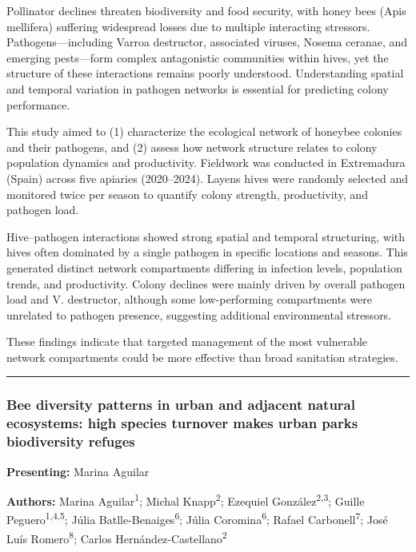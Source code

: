 \documentclass[
  letterpaper,
  DIV=11,
  numbers=noendperiod]{scrartcl}
\begin{document}
Pollinator declines threaten biodiversity and food security, with honey
bees (Apis mellifera) suffering widespread losses due to multiple
interacting stressors. Pathogens---including Varroa destructor,
associated viruses, Nosema ceranae, and emerging pests---form complex
antagonistic communities within hives, yet the structure of these
interactions remains poorly understood. Understanding spatial and
temporal variation in pathogen networks is essential for predicting
colony performance.

This study aimed to (1) characterize the ecological network of honeybee
colonies and their pathogens, and (2) assess how network structure
relates to colony population dynamics and productivity. Fieldwork was
conducted in Extremadura (Spain) across five apiaries (2020--2024).
Layens hives were randomly selected and monitored twice per season to
quantify colony strength, productivity, and pathogen load.

Hive--pathogen interactions showed strong spatial and temporal
structuring, with hives often dominated by a single pathogen in specific
locations and seasons. This generated distinct network compartments
differing in infection levels, population trends, and productivity.
Colony declines were mainly driven by overall pathogen load and V.
destructor, although some low-performing compartments were unrelated to
pathogen presence, suggesting additional environmental stressors.

These findings indicate that targeted management of the most vulnerable
network compartments could be more effective than broad sanitation
strategies.

\begin{center}\rule{0.5\linewidth}{0.5pt}\end{center}

\subsubsection{Bee diversity patterns in urban and adjacent natural
ecosystems: high species turnover makes urban parks biodiversity
refuges}\label{bee-diversity-patterns-in-urban-and-adjacent-natural-ecosystems-high-species-turnover-makes-urban-parks-biodiversity-refuges}

\textbf{Presenting:} Marina Aguilar

\textbf{Authors:} Marina Aguilar\textsuperscript{1}; Michal
Knapp\textsuperscript{2}; Ezequiel González\textsuperscript{2,3}; Guille
Peguero\textsuperscript{1,4,5}; Júlia
Batlle-Benaiges\textsuperscript{6}; Júlia Coromina\textsuperscript{6};
Rafael Carbonell\textsuperscript{7}; José Luís
Romero\textsuperscript{8}; Carlos
Hernández-Castellano\textsuperscript{2}
\end{document}
